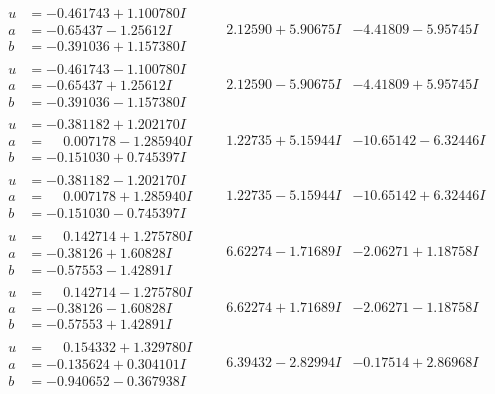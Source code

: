 \documentclass[1p]{elsarticle_modified}
\theoremstyle{definition}
\begin{document}
$$\begin{array}{c|c|c}
\begin{aligned}
u &= -0.461743 + 1.100780 I \\
a &= -0.65437 - 1.25612 I \\
b &= -0.391036 + 1.157380 I\end{aligned}
 & \phantom{-}2.12590 + 5.90675 I & -4.41809 - 5.95745 I \\ \hline\begin{aligned}
u &= -0.461743 - 1.100780 I \\
a &= -0.65437 + 1.25612 I \\
b &= -0.391036 - 1.157380 I\end{aligned}
 & \phantom{-}2.12590 - 5.90675 I & -4.41809 + 5.95745 I \\ \hline\begin{aligned}
u &= -0.381182 + 1.202170 I \\
a &= \phantom{-}0.007178 - 1.285940 I \\
b &= -0.151030 + 0.745397 I\end{aligned}
 & \phantom{-}1.22735 + 5.15944 I & -10.65142 - 6.32446 I \\ \hline\begin{aligned}
u &= -0.381182 - 1.202170 I \\
a &= \phantom{-}0.007178 + 1.285940 I \\
b &= -0.151030 - 0.745397 I\end{aligned}
 & \phantom{-}1.22735 - 5.15944 I & -10.65142 + 6.32446 I \\ \hline\begin{aligned}
u &= \phantom{-}0.142714 + 1.275780 I \\
a &= -0.38126 + 1.60828 I \\
b &= -0.57553 - 1.42891 I\end{aligned}
 & \phantom{-}6.62274 - 1.71689 I & -2.06271 + 1.18758 I \\ \hline\begin{aligned}
u &= \phantom{-}0.142714 - 1.275780 I \\
a &= -0.38126 - 1.60828 I \\
b &= -0.57553 + 1.42891 I\end{aligned}
 & \phantom{-}6.62274 + 1.71689 I & -2.06271 - 1.18758 I \\ \hline\begin{aligned}
u &= \phantom{-}0.154332 + 1.329780 I \\
a &= -0.135624 + 0.304101 I \\
b &= -0.940652 - 0.367938 I\end{aligned}
 & \phantom{-}6.39432 - 2.82994 I & -0.17514 + 2.86968 I \\ \hline\begin{aligned}

\end{aligned}
\end{array}$$
\end{document}
